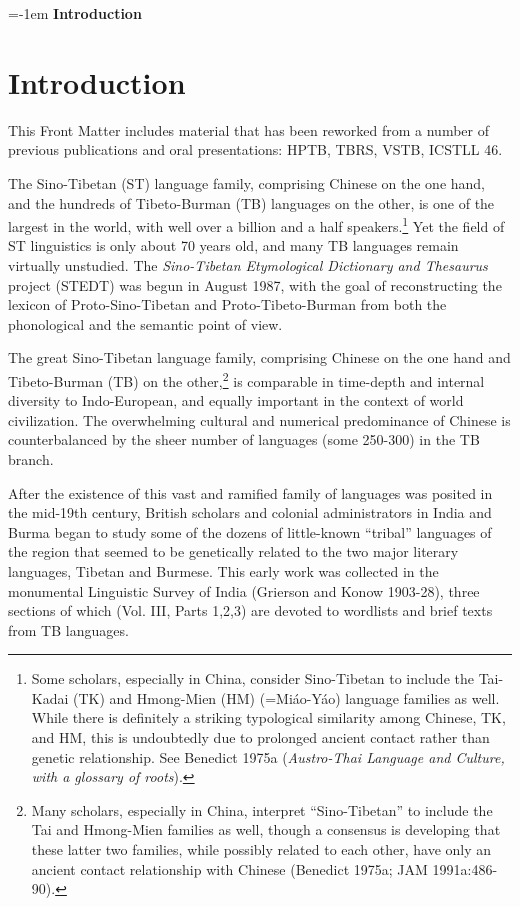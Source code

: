 {\large \parindent=-1em \textbf{Introduction}}
\vspace{0.25em}


\section{Introduction}
This Front Matter includes material that has been reworked from a number of previous publications and oral presentations: HPTB, TBRS, VSTB, ICSTLL 46.

The Sino-Tibetan (ST) language family, comprising Chinese on the one hand,
and the hundreds of Tibeto-Burman (TB) languages on the other, is one of the
largest in the world, with well over a billion and a half
speakers.\footnote{Some scholars, especially in China,
consider Sino-Tibetan to include the
Tai-Kadai (TK) and Hmong-Mien (HM) (=Miáo-Yáo) language families as well.  While
there is definitely a striking typological similarity among Chinese, TK, and HM,
this is undoubtedly due to prolonged ancient contact rather than genetic
relationship.  See Benedict 1975a (\textit{Austro-Thai Language and Culture, with a
glossary of roots}).}  Yet the field of ST linguistics is only about 70 years
old, and many TB languages remain virtually unstudied.  The \textit{Sino-Tibetan
Etymological Dictionary and Thesaurus} project (STEDT) was begun in August 1987,
with the goal of reconstructing the lexicon of Proto-Sino-Tibetan and
Proto-Tibeto-Burman from both the phonological and the semantic point of view.

The great Sino-Tibetan language family, comprising Chinese on the one hand and Tibeto-Burman (TB) on the other,\footnote{Many scholars, especially in China, interpret ``Sino-Tibetan'' to include the Tai and Hmong-Mien families as well, though a consensus is developing that these latter two families, while possibly related to each other, have only an ancient contact relationship with Chinese (Benedict 1975a; JAM 1991a:486-90).} is comparable in time-depth and internal diversity to Indo-European, and equally important in the context of world civilization. The overwhelming cultural and numerical predominance of Chinese is counterbalanced by the sheer number of languages (some 250-300) in the TB branch.

After the existence of this vast and ramified family of languages was posited in the mid-19th century, British scholars and colonial administrators in India and Burma began to study some of the dozens of little-known ``tribal'' languages of the region that seemed to be genetically related to the two major literary languages, Tibetan and Burmese. This early work was collected in the monumental Linguistic Survey of India (Grierson and Konow 1903-28), three sections of which (Vol. III, Parts 1,2,3) are devoted to wordlists and brief texts from TB languages.

